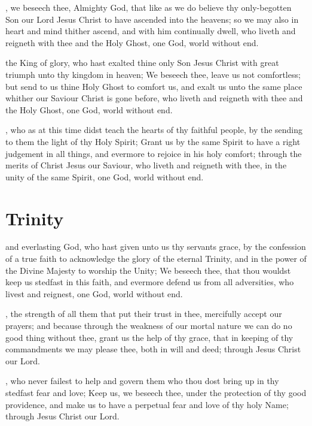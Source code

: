 , we beseech thee, Almighty God, that like as we do believe thy only-begotten Son our Lord Jesus Christ to have ascended into the heavens; so we may also in heart and mind thither ascend, and with him continually dwell, who liveth and reigneth with thee and the Holy Ghost, one God, world without end.

 the King of glory, who hast exalted thine only Son Jesus Christ with great triumph unto thy kingdom in heaven; We beseech thee, leave us not comfortless; but send to us thine Holy Ghost to comfort us, and exalt us unto the same place whither our Saviour Christ is gone before, who liveth and reigneth with thee and the Holy Ghost, one God, world without end.

, who as at this time didst teach the hearts of thy faithful people, by the sending to them the light of thy Holy Spirit; Grant us by the same Spirit to have a right judgement in all things, and evermore to rejoice in his holy comfort; through the merits of Christ Jesus our Saviour, who liveth and reigneth with thee, in the unity of the same Spirit, one God, world without end.

\section{Trinity}

 and everlasting God, who hast given unto us thy servants grace, by the confession of a true faith to acknowledge the glory of the eternal Trinity, and in the power of the Divine Majesty to worship the Unity; We beseech thee, that thou wouldst keep us stedfast in this faith, and evermore defend us from all adversities, who livest and reignest, one God, world without end.

, the strength of all them that put their trust in thee, mercifully accept our prayers; and because through the weakness of our mortal nature we can do no good thing without thee, grant us the help of thy grace, that in keeping of thy commandments we may please thee, both in will and deed; through Jesus Christ our Lord.

, who never failest to help and govern them who thou dost bring up in thy stedfast fear and love; Keep us, we beseech thee, under the protection of thy good providence, and make us to have a perpetual fear and love of thy holy Name; through Jesus Christ our Lord.

